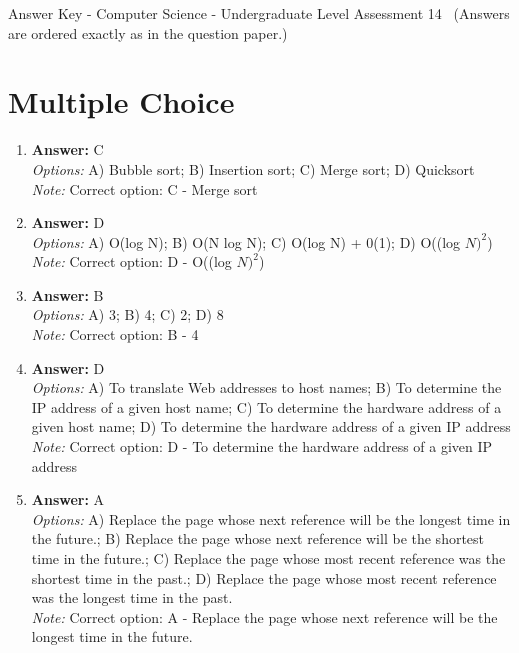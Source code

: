 \documentclass[12pt]{article}
\begin{document}
\begin{center}
Answer Key - Computer Science - Undergraduate Level Assessment 14 \
\small (Answers are ordered exactly as in the question paper.)
\end{center}

\section*{Multiple Choice}
\begin{enumerate}[label=\arabic*.]
\item \textbf{Answer:} C
\\ \textit{Options:} A) Bubble sort; B) Insertion sort; C) Merge sort; D) Quicksort
\\ \textit{Note:} Correct option: C - Merge sort
\item \textbf{Answer:} D
\\ \textit{Options:} A) O(log N); B) O(N log N); C) O(log N) + 0(1); D) O((log $N)^2$)
\\ \textit{Note:} Correct option: D - O((log $N)^2$)
\item \textbf{Answer:} B
\\ \textit{Options:} A) 3; B) 4; C) 2; D) 8
\\ \textit{Note:} Correct option: B - 4
\item \textbf{Answer:} D
\\ \textit{Options:} A) To translate Web addresses to host names; B) To determine the IP address of a given host name; C) To determine the hardware address of a given host name; D) To determine the hardware address of a given IP address
\\ \textit{Note:} Correct option: D - To determine the hardware address of a given IP address
\item \textbf{Answer:} A
\\ \textit{Options:} A) Replace the page whose next reference will be the longest time in the future.; B) Replace the page whose next reference will be the shortest time in the future.; C) Replace the page whose most recent reference was the shortest time in the past.; D) Replace the page whose most recent reference was the longest time in the past.
\\ \textit{Note:} Correct option: A - Replace the page whose next reference will be the longest time in the future.
\end{enumerate}
\end{document}
